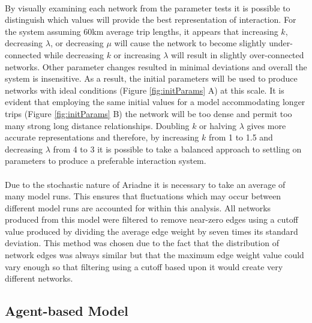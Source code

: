 \documentclass[12pt,a4paper]{thesis}
\begin{document}
\paragraph{}
By visually examining each network from the parameter tests it is possible to distinguish which values will provide the best representation of interaction. For the system assuming 60km average trip lengths, it appears that increasing $k$, decreasing $\lambda$, or decreasing $\mu$ will cause the network to become slightly under-connected while decreasing $k$ or increasing $\lambda$ will result in slightly over-connected networks. Other parameter changes resulted in minimal deviations and overall the system is insensitive. As a result, the initial parameters will be used to produce networks with ideal conditions (Figure \ref{fig:initParams} A) at this scale. It is evident that employing the same initial values for a model accommodating longer trips (Figure \ref{fig:initParams} B) the network will be too dense and permit too many strong long distance relationships. Doubling $k$ or halving $\lambda$ gives more accurate representations and therefore, by increasing $k$ from 1 to 1.5 and decreasing $\lambda$ from 4 to 3 it is possible to take a balanced approach to settling on parameters to produce a preferable interaction system.

\paragraph{}
Due to the stochastic nature of Ariadne it is necessary to take an average of many model runs. This ensures that fluctuations which may occur between different model runs are accounted for within this analysis. 
All networks produced from this model were filtered to remove near-zero edges using a cutoff value produced by dividing the average edge weight by seven times its standard deviation. This method was chosen due to the fact that the distribution of network edges was always similar but that the maximum edge weight value could vary enough so that filtering using a cutoff based upon it would create very different networks.  


\subsection{Agent-based Model}
\end{document}
